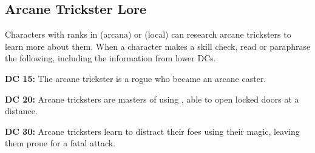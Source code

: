 







\subsection{Arcane Trickster Lore}
Characters with ranks in  (arcana) or  (local) can research arcane tricksters to learn more about them. When a character makes a skill check, read or paraphrase the following, including the information from lower DCs.

\textbf{DC 15:} The arcane trickster is a rogue who became an arcane caster.

\textbf{DC 20:} Arcane tricksters are masters of using , able to open locked doors at a distance.

\textbf{DC 30:} Arcane tricksters learn to distract their foes using their magic, leaving them prone for a fatal attack.
